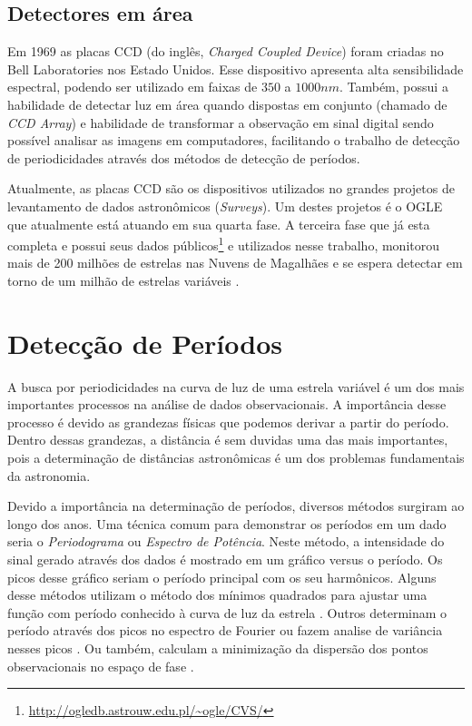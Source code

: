 \subsection{Detectores em área}

Em 1969 as placas CCD (do inglês, \textit{Charged Coupled Device}) foram criadas no Bell Laboratories nos Estado Unidos. Esse dispositivo apresenta alta sensibilidade espectral, podendo ser utilizado em faixas de $350$ a $1000 \si{nm}$. Também, possui a habilidade de detectar luz em área quando dispostas em conjunto (chamado de \textit{CCD Array}) e habilidade de transformar a observação em sinal digital sendo possível analisar as imagens em computadores, facilitando o trabalho de detecção de periodicidades através dos métodos de detecção de períodos.

Atualmente, as placas CCD são os dispositivos utilizados no grandes projetos de levantamento de dados astronômicos (\textit{Surveys}). Um destes projetos é o OGLE que atualmente está atuando em sua quarta fase. A terceira fase \citep{Udalski2008} que já esta completa e possui seus dados públicos\footnote{\url{http://ogledb.astrouw.edu.pl/~ogle/CVS/}} e utilizados nesse trabalho, monitorou mais de 200 milhões de estrelas nas Nuvens de Magalhães e se espera detectar em torno de um milhão de estrelas variáveis .


\section{Detecção de Períodos}

A busca por periodicidades na curva de luz de uma estrela variável é um dos mais importantes processos na análise de dados observacionais. A importância desse processo é devido as grandezas físicas que podemos derivar a partir do período. Dentro dessas grandezas, a distância é sem duvidas uma das mais importantes, pois a determinação de distâncias astronômicas é um dos problemas fundamentais da astronomia.

Devido a importância na determinação de períodos, diversos métodos surgiram ao longo dos anos. Uma técnica comum para demonstrar os períodos em um dado seria o \textit{Periodograma} ou \textit{Espectro de Potência}. Neste método, a intensidade do sinal gerado através dos dados é mostrado em um gráfico versus o período. Os picos desse gráfico seriam o período principal com os seu harmônicos. Alguns desse métodos utilizam o método dos mínimos quadrados para ajustar uma função com período conhecido à curva de luz da estrela \citep{lomb}. Outros determinam o período através dos picos no espectro de Fourier \citep{mello81} ou fazem analise de variância nesses picos \citep{aov}. Ou também, calculam a minimização da dispersão dos pontos observacionais no espaço de fase \citep{Cincotta1999, entropy, ce}.

